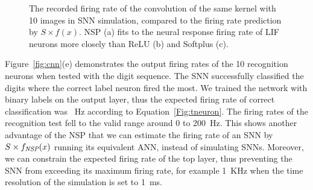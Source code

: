 \begin{figure}[tbh!]
\begin{subfigure}[t]{0.6\textwidth}
		\end{subfigure}
		\DIFdelbeginFL %
\DIFdelendFL \DIFaddbeginFL \caption[The recorded firing rate of the convolution outcomes.]{\DIFaddendFL 
			The recorded firing rate of the convolution of the same kernel with 10 images in SNN simulation, compared to the firing rate prediction by $S \times f(x)$.
			NSP (a) fits to the neural response firing rate of LIF neurons more closely than ReLU (b) and Softplus (c).}
		\label{fig:af_compare}
	\end{figure}

	Figure~\ref{fig:cnn}(e) demonstrates the output firing rates of the 10 recognition neurons when tested with the digit sequence.
	The SNN successfully classified the digits where the correct label neuron fired the most.
	We trained the network with binary labels on the output layer, thus the expected firing rate of correct classification was \DIFdelbegin {}\DIFdelend \DIFaddbegin {}\DIFaddend ~Hz according to Equation~\ref{Fig:tneuron}.
	The firing rates of the recognition test fell to the valid range around 0 to 200~Hz.
	This shows another advantage of the NSP that we can estimate the firing rate of an SNN by $S \times f_{\textit{\textrm{NSP}}}(x)$ running its equivalent ANN, instead of simulating SNNs.
	Moreover, we can constrain the expected firing rate of the top layer, thus preventing the SNN from exceeding its maximum firing rate, for example 1~KHz when the time resolution of the simulation is set to 1~ms.

